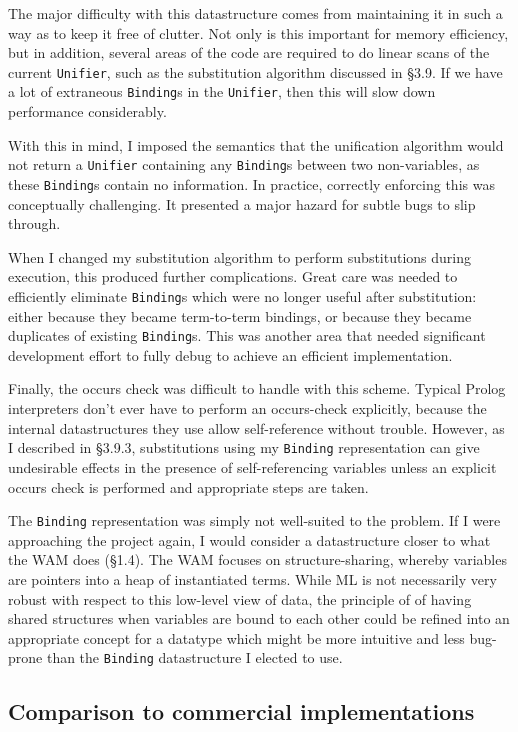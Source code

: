 \documentclass[12pt]{article}
\begin{document}
The major difficulty with this datastructure comes from maintaining it in such a way as to keep it free of clutter. 
Not only is this important for memory efficiency, but in addition, several areas of the code are required to do linear scans of the current \verb|Unifier|, such as the substitution algorithm discussed in \S3.9. 
If we have a lot of extraneous \verb|Binding|s in the \verb|Unifier|, then this will slow down performance considerably.

With this in mind, I imposed the semantics that the unification algorithm would not return a \verb|Unifier| containing any \verb|Binding|s between two non-variables, as these \verb|Binding|s contain no information. 
In practice, correctly enforcing this was conceptually challenging. 
It presented a major hazard for subtle bugs to slip through. 

When I changed my substitution algorithm to perform substitutions during execution, this produced further complications. 
Great care was needed to efficiently eliminate \verb|Binding|s which were no longer useful after substitution: either because they became term-to-term bindings, or because they became duplicates of existing \verb|Binding|s. 
This was another area that needed significant development effort to fully debug to achieve an efficient implementation.

Finally, the occurs check was difficult to handle with this scheme. 
Typical Prolog interpreters don't ever have to perform an occurs-check explicitly, because the internal datastructures they use allow self-reference without trouble.
However, as I described in \S3.9.3, substitutions using my \verb|Binding| representation can give undesirable effects in the presence of self-referencing variables unless an explicit occurs check is performed and appropriate steps are taken.

The \verb|Binding| representation was simply not well-suited to the problem. 
If I were approaching the project again, I would consider a datastructure closer to what the WAM does (\S1.4). 
The WAM focuses on structure-sharing, whereby variables are pointers into a heap of instantiated terms. 
While ML is not necessarily very robust with respect to this low-level view of data, the principle of of having shared structures when variables are bound to each other could be refined into an appropriate concept for a datatype which might be more intuitive and less bug-prone than the \verb|Binding| datastructure I elected to use.

\subsection{Comparison to commercial implementations}
\end{document}
